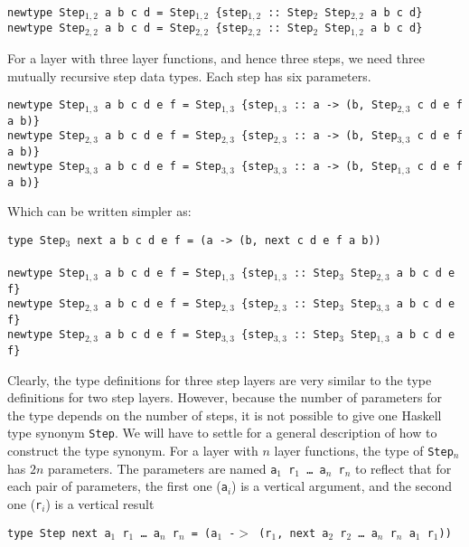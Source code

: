 {\tt newtype Step$_{1,2}$ a b c d = Step$_{1,2}$ \{step$_{1,2}$}\verb| :: |{\tt Step$_2$ Step$_{2,2}$  a b c d\}}\\
{\tt newtype Step$_{2,2}$ a b c d = Step$_{2,2}$ \{step$_{2,2}$}\verb| :: |{\tt Step$_2$ Step$_{1,2}$  a b c d\}}

For a layer with three layer functions, and hence three steps, we need three mutually recursive step data types. Each step has six parameters.

{\tt newtype Step$_{1,3}$ a b c d e f = Step$_{1,3}$ \{step$_{1,3}$}\verb| :: |{\tt a -> (b, Step$_{2,3}$ c d e f a b)\}}\\
{\tt newtype Step$_{2,3}$ a b c d e f = Step$_{2,3}$ \{step$_{2,3}$}\verb| :: |{\tt a -> (b, Step$_{3,3}$ c d e f a b)\}}\\
{\tt newtype Step$_{3,3}$ a b c d e f = Step$_{3,3}$ \{step$_{3,3}$}\verb| :: |{\tt a -> (b, Step$_{1,3}$ c d e f a b)\}}

Which can be written simpler as:

{\tt type Step$_3$ next a b c d e f = (a -> (b, next c d e f a b))}\\
\\
{\tt newtype Step$_{1,3}$ a b c d e f = Step$_{1,3}$ \{step$_{1,3}$}\verb| :: |{\tt Step$_3$ Step$_{2,3}$ a b c d e f\} }\\
{\tt newtype Step$_{2,3}$ a b c d e f = Step$_{2,3}$ \{step$_{2,3}$}\verb| :: |{\tt Step$_3$ Step$_{3,3}$ a b c d e f\} }\\
{\tt newtype Step$_{2,3}$ a b c d e f = Step$_{3,3}$ \{step$_{3,3}$}\verb| :: |{\tt Step$_3$ Step$_{1,3}$ a b c d e f\} }

Clearly, the type definitions for three step layers are very similar to the type definitions for two step layers. However, because the number of parameters for the type depends on the number of steps, it is not possible to give one Haskell type synonym \texttt{Step}. We will have to settle for a general description of how to construct the type synonym. For a layer with $n$ layer functions, the type of \texttt{Step$_n$} has $2n$ parameters. The parameters are named \texttt{a$_1$ r$_1$ \dots ~a$_n$ r$_n$} to reflect that for each pair of parameters, the first one (\texttt{a$_i$}) is a vertical argument, and the second one (\texttt{r$_i$}) is a vertical result 

\begin{tabbing}
{\tt type St}\={\tt ep next a$_1$ r$_1$ \dots ~a$_n$ r$_n$ = (a$_1$ -$>$  (r$_1$, next a$_2$ r$_2$ \dots ~a$_n$ r$_n$ a$_1$ r$_1$)) }
\end{tabbing}

